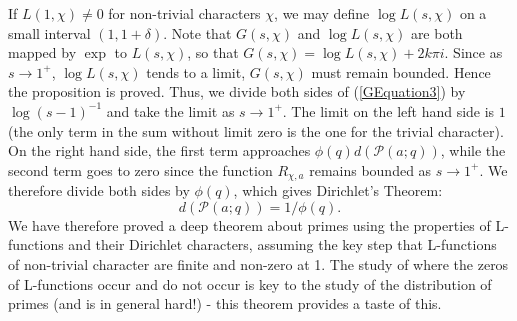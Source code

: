 If $L(1, \chi) \neq 0$ for non-trivial characters $\chi$, we may define $\log L(s, \chi)$ on a small interval $(1, 1 + \delta)$. Note that $G(s, \chi)$ and $\log L(s, \chi)$ are both mapped by $\exp$ to $L(s, \chi)$, so that $G(s, \chi) = \log L(s, \chi) + 2k\pi i $. Since as $s \rightarrow 1^{+}$, $\log L(s, \chi)$ tends to a limit, $G(s, \chi)$ must remain bounded. Hence the proposition is proved. Thus, we divide both sides of (\ref{GEquation3}) by $\log (s - 1)^{-1}$ and take the limit as $s \rightarrow 1^{+}$. The limit on the left hand side is $1$ (the only term in the sum without limit zero is the one for the trivial character). On the right hand side, the first term approaches $\phi(q) d\left(\mathcal{P}(a; q)\right)$, while the second term goes to zero since the function $R_{\chi, a}$ remains bounded as $s \rightarrow 1^{+}$. We therefore divide both sides by $\phi(q)$, which gives Dirichlet's Theorem: 
\begin{equation}
    d\left(\mathcal{P}(a; q)\right) = 1/\phi(q). \nonumber
\end{equation}
We have therefore proved a deep theorem about primes using the properties of L-functions and their Dirichlet characters, assuming the key step that L-functions of non-trivial character are finite and non-zero at 1. The study of where the zeros of L-functions occur and do not occur is key to the study of the distribution of primes (and is in general hard!) - this theorem provides a taste of this. \\
